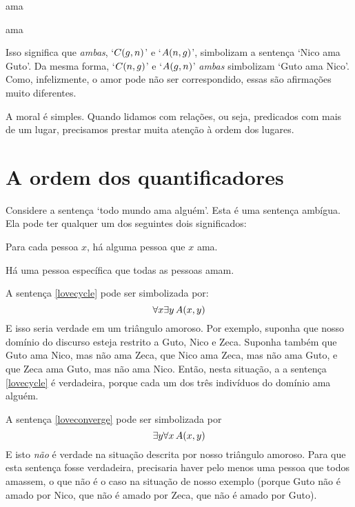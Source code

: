 \begin{center}
	\begin{ekey}
		\item[\atom{A}{x,y}]  ama 
		\item[\atom{C}{x,y}]  ama 
	\end{ekey}
\end{center}
Isso significa que \emph{ambas}, `$\mathord{C}(g,n)$' e `$\mathord{A}(n,g)$',  simbolizam a sentença `Nico ama Guto'.
Da mesma forma, `$\mathord{C}(n,g)$' e `$\mathord{A}(g,n)$'
\emph{ambas} simbolizam `Guto ama Nico'.
Como, infelizmente, o amor pode não ser correspondido, essas são afirmações muito diferentes.

A moral é simples. Quando lidamos com relações, ou seja, predicados com mais de um lugar, precisamos prestar muita atenção à ordem dos lugares.


\section{A ordem dos quantificadores}
Considere a sentença `todo mundo ama alguém'.
Esta é uma sentença ambígua.
Ela pode ter qualquer um dos seguintes dois significados:
	\begin{earg}
		\item[\ex{lovecycle}] Para cada pessoa $x$, há alguma pessoa que $x$ ama.
		\item[\ex{loveconverge}] Há uma pessoa específica que todas as pessoas amam.
	\end{earg}
A sentença \ref{lovecycle} pode ser simbolizada por:
$$\forall x \exists y\, \mathord{A}(x,y)$$
E isso seria verdade em um triângulo amoroso.
Por exemplo, suponha que nosso domínio do discurso esteja restrito a Guto, Nico e Zeca.
Suponha também que Guto ama Nico, mas não ama Zeca, que Nico ama Zeca, mas não ama Guto, e que Zeca ama Guto, mas não ama Nico.
Então, nesta situação, a a sentença \ref{lovecycle} é verdadeira, porque cada um dos três indivíduos do domínio ama alguém.

A sentença \ref{loveconverge} pode ser simbolizada por
$$\exists y \forall x\, \mathord{A}(x,y)$$
E isto \emph{não} é verdade na situação descrita por nosso triângulo amoroso.
Para que esta sentença fosse verdadeira, precisaria haver pelo menos uma pessoa que todos amassem, o que não é o caso na situação de nosso exemplo (porque Guto não é amado por Nico, que não é amado por Zeca, que não é amado por Guto).

